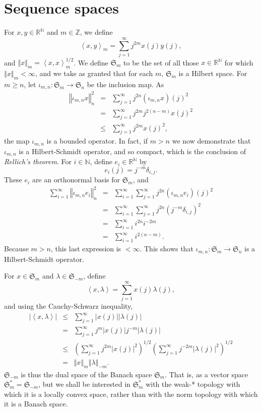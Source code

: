 \documentclass{article}
\newcommand{\inner}[2]{\left\langle #1, #2 \right\rangle}
\newcommand{\norm}[1]{\left\Vert #1 \right\Vert}
\theoremstyle{definition}
\begin{document}
\section{Sequence spaces} 
For $x,y \in \mathbb{R}^{\mathbb{N}}$ and $m \in \mathbb{Z}$, we define
\[
\inner{x}{y}_m =\sum_{j=1}^\infty j^{2m} x(j) y(j),
\]
and $\norm{x}_m = \inner{x}{x}_m^{1/2}$.
We define $\mathfrak{S}_m$ to be the set of all those $x \in \mathbb{R}^{\mathbb{N}}$ for which $\norm{x}_m<\infty$, and we take as granted that for each $m$, $\mathfrak{S}_m$
is a Hilbert space. For $m \geq n$, let $\iota_{m,n}:\mathfrak{S}_m \to \mathfrak{S}_n$ be the inclusion map. As
\begin{eqnarray*}
\norm{\iota_{m,n} x}_n^2 &=& \sum_{j=1}^\infty j^{2n} (\iota_{m,n} x)(j)^2\\
&=& \sum_{j=1}^\infty j^{2m} j^{2(n-m)} x(j)^2\\
&\leq&\sum_{j=1}^\infty j^{2m} x(j)^2, 
\end{eqnarray*}
the map
$\iota_{m,n}$ is a bounded operator.
In fact, if $m>n$ we now demonstrate that $\iota_{m,n}$ is a Hilbert-Schmidt operator, and so compact, which is the conclusion of {\em Rellich's theorem}.
For $i \in \mathbb{N}$, define $e_i \in \mathbb{R}^{\mathbb{N}}$
by 
\[
e_i(j) =j^{-m}  \delta_{i,j}.
\]
These $e_i$ are an orthonormal basis for $\mathfrak{S}_m$, and 
\begin{eqnarray*}
\sum_{i=1}^\infty \norm{\iota_{m,n} e_i}_n^2&=&\sum_{i=1}^\infty \sum_{j=1}^\infty j^{2n} (\iota_{m,n} e_i)(j)^2\\
&=&\sum_{i=1}^\infty \sum_{j=1}^\infty j^{2n} \left(  j^{-m}\delta_{i,j}\right)^2\\
&=&\sum_{i=1}^\infty  i^{2n} i^{-2m}\\
&=&\sum_{i=1}^\infty i^{2(n-m)}.
\end{eqnarray*}
Because $m>n$, this last expression is $<\infty$. This shows that $\iota_{m,n}:\mathfrak{S}_m \to \mathfrak{S}_n$ is a Hilbert-Schmidt operator.



For $x \in \mathfrak{S}_m$ and $\lambda \in \mathfrak{S}_{-m}$, define
\begin{equation}
\inner{x}{\lambda}=\sum_{j=1}^\infty x(j) \lambda(j),
\label{dualpairing}
\end{equation}
and using the Cauchy-Schwarz inequality,
\begin{eqnarray*}
|\inner{x}{\lambda}|&\leq&\sum_{j =1}^\infty |x(j)| |\lambda(j)|\\
&=&\sum_{j =1}^\infty j^m |x(j)| j^{-m} |\lambda(j)|\\
&\leq&\left(\sum_{j=1}^\infty j^{2m} |x(j)|^2 \right)^{1/2} \left( \sum_{j=1}^\infty j^{-2m} |\lambda(j)|^2 \right)^{1/2}\\
&=&\norm{x}_m \norm{\lambda}_{-m}.
\end{eqnarray*}
$\mathfrak{S}_{-m}$ is thus the dual space of the Banach space $\mathfrak{S}_m$. That is, as a vector space $\mathfrak{S}_m^* = \mathfrak{S}_{-m}$, but
we shall be interested in $\mathfrak{S}_m^*$ with the weak-* topology with which it is a locally convex space, rather than with the norm topology with which it is a Banach space.
\end{document}
